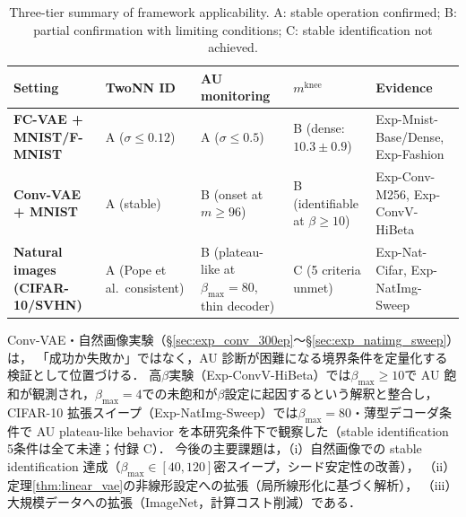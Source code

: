\documentclass[11pt,a4paper]{jsarticle}
\newcommand{\mknee}{m^{\mathrm{knee}}}
\begin{document}
\begin{table}[H]
\centering
\caption{Three-tier summary of framework applicability. A: stable operation confirmed; B: partial confirmation with limiting conditions; C: stable identification not achieved.}
\label{tab:applicability_tier}
\small
\begin{tabular}{p{3.5cm}p{2.5cm}p{2.3cm}p{2.3cm}p{3.0cm}}
\toprule
Setting & TwoNN ID & AU monitoring & $\mknee$ & Evidence \\
\midrule
\textbf{FC-VAE + MNIST/F-MNIST}
  & A ($\sigma\leq0.12$)
  & A ($\sigma\leq0.5$)
  & B (dense: $10.3\pm0.9$)
  & Exp-Mnist-Base/Dense, Exp-Fashion \\
\addlinespace
\textbf{Conv-VAE + MNIST}
  & A (stable)
  & B (onset at $m\geq96$)
  & B (identifiable at $\beta\geq10$)
  & Exp-Conv-M256, Exp-ConvV-HiBeta \\
\addlinespace
\textbf{Natural images (CIFAR-10/SVHN)}
  & A (Pope et al.\ consistent)
  & B (plateau-like at $\beta_{\max}=80$, thin decoder)
  & C (5 criteria unmet)
  & Exp-Nat-Cifar, Exp-NatImg-Sweep \\
\bottomrule
\end{tabular}
\end{table}

Conv-VAE・自然画像実験（§\ref{sec:exp_conv_300ep}〜§\ref{sec:exp_natimg_sweep}）は，
「成功か失敗か」ではなく，AU 診断が困難になる境界条件を定量化する検証として位置づける．
高$\beta$実験（Exp-ConvV-HiBeta）では$\beta_{\max} \geq 10$で AU 飽和が観測され，$\beta_{\max}=4$での未飽和が$\beta$設定に起因するという解釈と整合し，
CIFAR-10 拡張スイープ（Exp-NatImg-Sweep）では$\beta_{\max}=80$・薄型デコーダ条件で
AU plateau-like behavior を本研究条件下で観察した（stable identification 5条件は全て未達；付録 C）．
今後の主要課題は，（i）自然画像での stable identification 達成（$\beta_{\max} \in [40,120]$密スイープ，シード安定性の改善），
（ii）定理\ref{thm:linear_vae}の非線形設定への拡張（局所線形化に基づく解析），
（iii）大規模データへの拡張（ImageNet，計算コスト削減）である．
\end{document}
